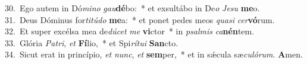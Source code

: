 {30.~}Ego autem in Dó\textit{mi}\textit{no} \textit{gau}\textbf{dé}bo:~* et exsultábo in De\textit{o} \textit{Je}\textit{su} \textbf{me}o.\\
{31.~}Deus Dóminus for\textit{ti}\textit{tú}\textit{do} \textbf{me}a:~* et ponet pedes meos \textit{qua}\textit{si} \textit{cer}\textbf{vó}rum.\\
{32.~}Et super excélsa mea de\textit{dú}\textit{cet} \textit{me} \textbf{vi}ctor~* in \textit{psal}\textit{mis} \textit{ca}\textbf{nén}tem.\\
{33.~}Glória \textit{Pa}\textit{tri}, \textit{et} \textbf{Fí}lio,~* et Spi\textit{rí}\textit{tu}\textit{i} \textbf{San}cto.\\
{34.~}Sicut erat in princípio, \textit{et} \textit{nunc}, \textit{et} \textbf{sem}per,~* et in sǽcula sæ\textit{cu}\textit{ló}\textit{rum}. \textbf{A}men.\\
